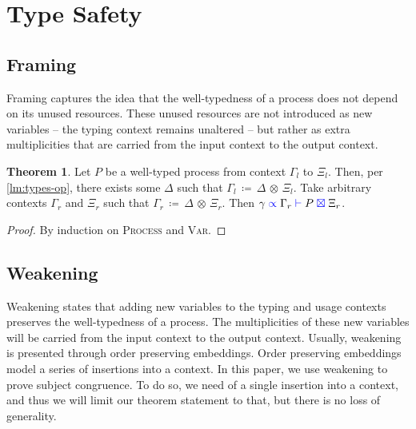 \documentclass[a4paper,UKenglish,cleveref, autoref, thm-restate,authorcolumns]{lipics-v2019}
\theoremstyle{definition}
\newtheorem{nitheorem}[theorem]{Theorem}
\newcommand{\type}[1]{\textcolor{blue}{\operatorname{#1}}}
\newcommand{\opctx}[3]{#1 \, \coloneqq \, #2 \, \otimes \, #3}
\newcommand{\types}[4]{#1 \; \type{\propto} \; #2 \; \type{\vdash} \; #3 \; \type{\boxtimes} \; #4}
\begin{document}
\section{Type Safety}
\label{type-safety}


\subsection{Framing}
\label{framing}

Framing captures the idea that the well-typedness of a process does not depend on its unused resources.
These unused resources are not introduced as new variables -- the typing context remains unaltered -- but rather as extra multiplicities that are carried from the input context to the output context.

\begin{nitheorem}
  \label{thm:framing}
  Let $P$ be a well-typed process from context $\Gamma_l$ to $\Xi_l$.
  Then, per \autoref{lm:types-op}, there exists some $\Delta$ such that $\opctx{\Gamma_l}{\Delta}{\Xi_l}$.
  Take arbitrary contexts $\Gamma_r$ and $\Xi_r$ such that $\opctx{\Gamma_r}{\Delta}{\Xi_r}$.
  Then $\types{\gamma}{\Gamma_r}{P}{\Xi_r}$.
\end{nitheorem}
\begin{proof}
  By induction on \textsc{Process} and \textsc{Var}.
\end{proof}

\subsection{Weakening}
\label{weakening}

Weakening states that adding new variables to the typing and usage contexts preserves the well-typedness of a process.
The multiplicities of these new variables will be carried from the input context to the output context.
Usually, weakening is presented through order preserving embeddings.
Order preserving embeddings model a series of insertions into a context.
In this paper, we use weakening to prove subject congruence.
To do so, we need of a single insertion into a context, and thus we will limit our theorem statement to that, but there is no loss of generality.
\end{document}

